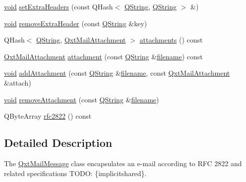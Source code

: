 \begin{DoxyCompactItemize}
\item 
\hyperlink{group___u_a_v_objects_plugin_ga444cf2ff3f0ecbe028adce838d373f5c}{void} \hyperlink{class_qxt_mail_message_a74dd49b6d2180c79ebfdead0da18a2e4}{set\-Extra\-Headers} (const Q\-Hash$<$ \hyperlink{group___u_a_v_objects_plugin_gab9d252f49c333c94a72f97ce3105a32d}{Q\-String}, \hyperlink{group___u_a_v_objects_plugin_gab9d252f49c333c94a72f97ce3105a32d}{Q\-String} $>$ \&)
\item 
\hyperlink{group___u_a_v_objects_plugin_ga444cf2ff3f0ecbe028adce838d373f5c}{void} \hyperlink{class_qxt_mail_message_a8db703e6a662d3ab8a7d75a86a0ba678}{remove\-Extra\-Header} (const \hyperlink{group___u_a_v_objects_plugin_gab9d252f49c333c94a72f97ce3105a32d}{Q\-String} \&key)
\item 
Q\-Hash$<$ \hyperlink{group___u_a_v_objects_plugin_gab9d252f49c333c94a72f97ce3105a32d}{Q\-String}, \hyperlink{class_qxt_mail_attachment}{Qxt\-Mail\-Attachment} $>$ \hyperlink{class_qxt_mail_message_ac6e227f9b795dfeb24be226015a0ba48}{attachments} () const 
\item 
\hyperlink{class_qxt_mail_attachment}{Qxt\-Mail\-Attachment} \hyperlink{class_qxt_mail_message_a34e9ce6ec827cfb93ef705dccdfd5a31}{attachment} (const \hyperlink{group___u_a_v_objects_plugin_gab9d252f49c333c94a72f97ce3105a32d}{Q\-String} \&\hyperlink{ioapi_8h_a7a03a664b090ce5c848ecb31cb4a2fa8}{filename}) const 
\item 
\hyperlink{group___u_a_v_objects_plugin_ga444cf2ff3f0ecbe028adce838d373f5c}{void} \hyperlink{class_qxt_mail_message_aa174422850bfe5e6ee1bf978c1938524}{add\-Attachment} (const \hyperlink{group___u_a_v_objects_plugin_gab9d252f49c333c94a72f97ce3105a32d}{Q\-String} \&\hyperlink{ioapi_8h_a7a03a664b090ce5c848ecb31cb4a2fa8}{filename}, const \hyperlink{class_qxt_mail_attachment}{Qxt\-Mail\-Attachment} \&attach)
\item 
\hyperlink{group___u_a_v_objects_plugin_ga444cf2ff3f0ecbe028adce838d373f5c}{void} \hyperlink{class_qxt_mail_message_adca697d86d9f17867e67c377629a0158}{remove\-Attachment} (const \hyperlink{group___u_a_v_objects_plugin_gab9d252f49c333c94a72f97ce3105a32d}{Q\-String} \&\hyperlink{ioapi_8h_a7a03a664b090ce5c848ecb31cb4a2fa8}{filename})
\item 
Q\-Byte\-Array \hyperlink{class_qxt_mail_message_a8a668ea11bf2b7bd73a7e4495dfb9d87}{rfc2822} () const 
\end{DoxyCompactItemize}


\subsection{Detailed Description}
The \hyperlink{class_qxt_mail_message}{Qxt\-Mail\-Message} class encapsulates an e-\/mail according to R\-F\-C 2822 and related specifications T\-O\-D\-O\-: \{implicitshared\}. 

